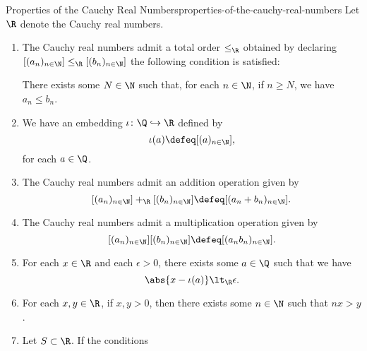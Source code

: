 \begin{proposition}{Properties of the Cauchy Real Numbers}{properties-of-the-cauchy-real-numbers}%
    Let $\R$ denote the Cauchy real numbers.
    \begin{enumerate}
        \item\label{properties-of-the-cauchy-real-numbers-total-order}The Cauchy real numbers admit a total order $\leq_{\R}$ obtained by declaring $[(a_{n})_{n\in\N}]\leq_{\R}[(b_{n})_{n\in\N}]$ \textiff the following condition is satisfied:
            \begin{itemize}
                \itemstar There exists some $N\in\N$ such that, for each $n\in\N$, if $n\geq N$, we have $a_{n}\leq b_{n}$.
            \end{itemize}
        \item\label{properties-of-the-cauchy-real-numbers-the-embedding-of-q-into-r}We have an embedding $\iota\colon\Q\hookrightarrow\R$ defined by
            \[
                \iota(a)%
                \defeq%
                [(a)_{n\in\N}],%
            \]%
            for each $a\in\Q$.
        \item\label{properties-of-the-cauchy-real-numbers-addition}The Cauchy real numbers admit an addition operation given by
            \[
                [(a_{n})_{n\in\N}]+_{\R}[(b_{n})_{n\in\N}]%
                \defeq%
                [(a_{n}+b_{n})_{n\in\N}].%
            \]%
        \item\label{properties-of-the-cauchy-real-numbers-multiplication}The Cauchy real numbers admit a multiplication operation given by
            \[
                [(a_{n})_{n\in\N}][(b_{n})_{n\in\N}]%
                \defeq%
                [(a_{n}b_{n})_{n\in\N}].%
            \]%
        \item\label{properties-of-the-cauchy-real-numbers-rational-approximation}For each $x\in\R$ and each $\epsilon\gt0$, there exists some $a\in\Q$ such that we have
            \[
                \abs{x-\iota(a)}%
                \lt_{\R}%
                \epsilon.%
            \]%
        \item\label{properties-of-the-cauchy-real-numbers-the-archimedean-property}For each $x,y\in\R$, if $x,y\gt0$, then there exists some $n\in\N$ such that $nx\gt y$.
        \item\label{properties-of-the-cauchy-real-numbers-the-cauchy-real-numbers-admit-suprema-of-bounded-subsets}Let $S\subset\R$. If the conditions

\end{enumerate}
\end{proposition}
